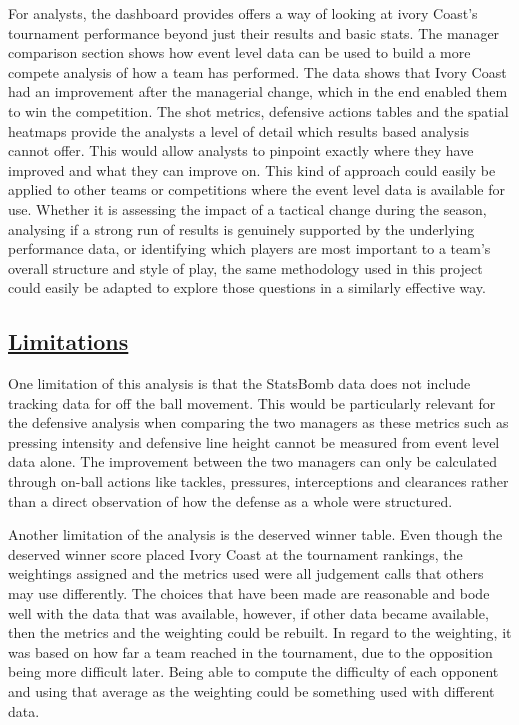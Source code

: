 \documentclass[
  11pt,
  letterpaper,
  DIV=11,
  numbers=noendperiod]{scrartcl}
\begin{document}
For analysts, the dashboard provides offers a way of looking at ivory
Coast's tournament performance beyond just their results and basic
stats. The manager comparison section shows how event level data can be
used to build a more compete analysis of how a team has performed. The
data shows that Ivory Coast had an improvement after the managerial
change, which in the end enabled them to win the competition. The shot
metrics, defensive actions tables and the spatial heatmaps provide the
analysts a level of detail which results based analysis cannot offer.
This would allow analysts to pinpoint exactly where they have improved
and what they can improve on. This kind of approach could easily be
applied to other teams or competitions where the event level data is
available for use. Whether it is assessing the impact of a tactical
change during the season, analysing if a strong run of results is
genuinely supported by the underlying performance data, or identifying
which players are most important to a team's overall structure and style
of play, the same methodology used in this project could easily be
adapted to explore those questions in a similarly effective way.

\subsection{\texorpdfstring{\ul{Limitations}}{Limitations}}\label{limitations}

One limitation of this analysis is that the StatsBomb data does not
include tracking data for off the ball movement. This would be
particularly relevant for the defensive analysis when comparing the two
managers as these metrics such as pressing intensity and defensive line
height cannot be measured from event level data alone. The improvement
between the two managers can only be calculated through on-ball actions
like tackles, pressures, interceptions and clearances rather than a
direct observation of how the defense as a whole were structured.

Another limitation of the analysis is the deserved winner table. Even
though the deserved winner score placed Ivory Coast at the tournament
rankings, the weightings assigned and the metrics used were all
judgement calls that others may use differently. The choices that have
been made are reasonable and bode well with the data that was available,
however, if other data became available, then the metrics and the
weighting could be rebuilt. In regard to the weighting, it was based on
how far a team reached in the tournament, due to the opposition being
more difficult later. Being able to compute the difficulty of each
opponent and using that average as the weighting could be something used
with different data.
\end{document}
